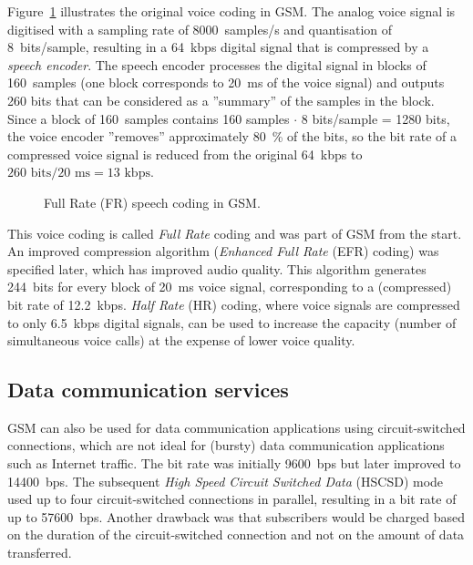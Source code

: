 Figure~\ref{fig:gsm_voicecoding} illustrates the original voice coding in GSM. The analog voice signal is digitised with a sampling rate of 8000~samples/s and quantisation of 8~bits/sample, resulting in a 64~kbps digital signal that is compressed by a \emph{speech encoder}. The speech encoder processes the digital signal in blocks of 160~samples (one block corresponds to 20~ms of the voice signal) and outputs 260 bits that can be considered as a ''summary'' of the samples in the block. Since a block of 160~samples contains 160 samples $\cdot$ 8 bits/sample = 1280 bits, the voice encoder ''removes'' approximately 80~\% of the bits, so the bit rate of a compressed voice signal is reduced from the original 64~kbps to ${260\textrm{ bits}}/{20\textrm{ ms}}=13\textrm{ kbps}$.
\begin{figure}[htbp]
\centering
{}
\caption{\label{fig:gsm_voicecoding}Full Rate (FR) speech coding in GSM.}
\end{figure}

This voice coding is called \emph{Full Rate} coding and was part of GSM from the start. An improved compression algorithm (\emph{Enhanced Full Rate} (EFR) coding) was specified later, which has improved audio quality. This algorithm generates 244~bits for every block of 20~ms voice signal, corresponding to a (compressed) bit rate of 12.2~kbps. \emph{Half Rate} (HR) coding, where voice signals are compressed to only 6.5~kbps digital signals, can be used to increase the capacity (number of simultaneous voice calls) at the expense of lower voice quality.

\subsection{Data communication services}
GSM can also be used for data communication applications using circuit-switched connections, which are not ideal for (bursty) data communication applications such as Internet traffic. The bit rate was initially 9600~bps but later improved to 14400~bps. The subsequent \emph{High Speed Circuit Switched Data} (HSCSD) mode used up to four circuit-switched connections in parallel, resulting in a bit rate of up to 57600~bps. Another drawback  was that subscribers would be charged based on the duration of the circuit-switched connection and not on the amount of data transferred.

